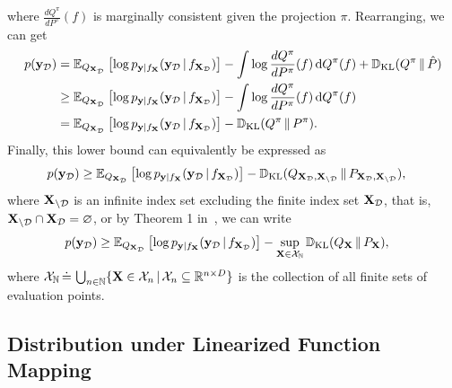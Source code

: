 \begin{appendices}
where $\frac{d Q^{\pi}}{d P^{\pi}}(f)$ is marginally consistent given the projection $\pi$.
Rearranging, we can get
\begin{align}
    p(\mathbf y_{\mathcal{D}})
    &=
    \operatorname{\mathbb{E}}_{Q_{\mathbf X_{\mathcal{D}}}}\left[\log p_{\mathbf y | f_{\mathbf X}}(\mathbf y_{\mathcal{D}} \,|\, f_{\mathbf X_{\mathcal{D}}})\right] - \int \log {\frac{d Q^{\pi}}{d P^{\pi}}(f)} \,\textrm{d} Q^{\pi}(f) + \mathbb{D}_{\textrm{KL}}(Q^{\pi} \,\|\, \hat{P} )
    \\
    &\geq
    \operatorname{\mathbb{E}}_{Q_{\mathbf X_{\mathcal{D}}}}\left[\log p_{\mathbf y | f_{\mathbf X}}(\mathbf y_{\mathcal{D}} \,|\, f_{\mathbf X_{\mathcal{D}}})\right] - \int \log {\frac{d Q^{\pi}}{d P^{\pi}}(f)} \,\textrm{d} Q^{\pi}(f)
    \\
    &=
    \operatorname{\mathbb{E}}_{Q_{\mathbf X_{\mathcal{D}}}}\left[\log p_{\mathbf y | f_{\mathbf X}}(\mathbf y_{\mathcal{D}} \,|\, f_{\mathbf X_{\mathcal{D}}})\right] - \mathbb{D}_{\textrm{KL}}(Q^{\pi} \,\|\, P^{\pi}) .
\end{align}
Finally, this lower bound can equivalently be expressed as
\begin{align}
    p(\mathbf y_{\mathcal{D}})
    &
    \geq
    \operatorname{\mathbb{E}}_{Q_{\mathbf X_{\mathcal{D}}}}\left[\log p_{\mathbf y | f_{\mathbf X}}(\mathbf y_{\mathcal{D}} \,|\, f_{\mathbf X_{\mathcal{D}}})\right] - \mathbb{D}_{\textrm{KL}}(Q_{\mathbf X_{\mathcal{D}}, \mathbf X_{\backslash \mathcal{D}}} \,\|\, P_{\mathbf X_{\mathcal{D}}, \mathbf X_{\backslash \mathcal{D}}}),
\end{align}
where $\mathbf X_{\backslash \mathcal{D}}$ is an infinite index set excluding the finite index set $\mathbf X_{\mathcal{D}}$, that is, $\mathbf X_{\backslash \mathcal{D}} \cap \mathbf X_{\mathcal{D}} = \varnothing$, or by Theorem 1 in~\citet{sun2019fbnn}, we can write 
\begin{align}
    p(\mathbf y_{\mathcal{D}})
    &\geq
    \operatorname{\mathbb{E}}_{Q_{\mathbf X_{\mathcal{D}}}}\left[\log p_{\mathbf y | f_{\mathbf X}}(\mathbf y_{\mathcal{D}} \,|\, f_{\mathbf X_{\mathcal{D}}})\right] - \sup_{\mathbf X \in \mathcal{X}_{\mathbb{N}}} \mathbb{D}_{\textrm{KL}}(Q_{\mathbf X} \,\|\, P_{\mathbf X}),
\end{align}
where $\mathcal{X}_{\mathbb{N}} \,\dot{=}\, \bigcup_{n \in \mathbb{N}} \{ \mathbf X \in \mathcal{X}_{n} \,|\, \mathcal{X}_{n} \subseteq \mathbb{R}^{n \times D} \}$ is the collection of all finite sets of evaluation points.


\clearpage


\subsection{Distribution under Linearized Function Mapping}
\label{appsec:linearization_proof}


\end{appendices}
